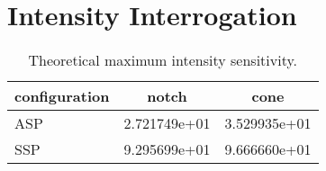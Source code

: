 \section{Intensity Interrogation}




\begin{table}
\centering
\begin{tabular}{lSS}
\toprule
{configuration} & {notch} & {cone} \\
\midrule
ASP & 2.721749e+01 & 3.529935e+01 \\
SSP & 9.295699e+01 & 9.666660e+01 \\
\bottomrule
\end{tabular}
\caption{Theoretical maximum intensity sensitivity.}
\label{tbl:intensitysens}
\end{table}

